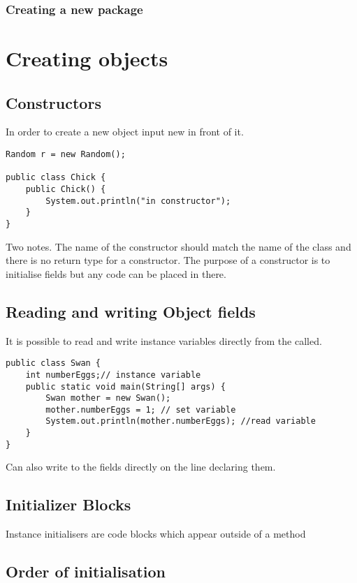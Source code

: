 \documentclass[a4paper]{report}   %
\begin{document}
\subsubsection{Creating a new package}

\section{Creating objects}

\subsection*{Constructors}

In order to create a new object input new in front of it.

\begin{lstlisting}
Random r = new Random();

public class Chick {
	public Chick() {
		System.out.println("in constructor");
	}
}
\end{lstlisting}

Two notes. The name of the constructor should match the name of the class and there is no return type for a constructor. The purpose of a constructor is to initialise fields but any code can be placed in there. 

\subsection{Reading and writing Object fields}

It is possible to read and write instance variables directly from the called.

\begin{lstlisting}
public class Swan {
	int numberEggs;// instance variable
	public static void main(String[] args) {
		Swan mother = new Swan();
		mother.numberEggs = 1; // set variable
		System.out.println(mother.numberEggs); //read variable
	}
}
\end{lstlisting}

Can also write to the fields directly on the line declaring them.

\subsection{Initializer Blocks}

Instance initialisers are code blocks which appear outside of a method
\subsection{Order of initialisation}
\end{document}

